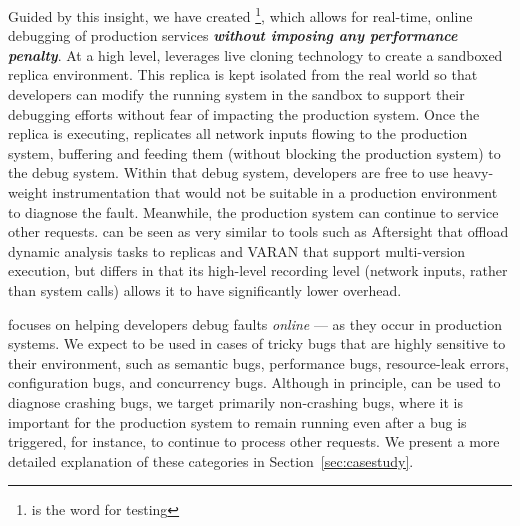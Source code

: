 Guided by this insight, we have created \parikshan\footnote{\parikshan is the \toolNameLang word for  testing}, which allows for real-time, online debugging of production services \textbf{\emph{without imposing any performance penalty}}.
At a high level, \parikshan leverages live cloning technology to create a sandboxed replica environment.
This replica is kept isolated from the real world so that developers can modify the running system in the sandbox to support their debugging efforts without fear of impacting the production system.
Once the replica is executing, \parikshan replicates all network inputs flowing to the production system, buffering and feeding them (without blocking the production system) to the debug system.
Within that debug system, developers are free to use heavy-weight instrumentation that would not be suitable in a production environment to diagnose the fault.
Meanwhile, the production system can continue to service other requests.
\parikshan can be seen as very similar to tools such as Aftersight \cite{aftersight} that offload dynamic analysis tasks to replicas and VARAN \cite{Hosek:2015:VUE:2694344.2694390} that support multi-version execution, but differs in that its high-level recording level (network inputs, rather than system calls) allows it to have significantly lower overhead.


\parikshan focuses on helping developers debug faults \emph{online} --- as they occur in production systems.
We expect \parikshan to be used in cases of tricky bugs that are highly sensitive to their environment, such as semantic bugs, performance bugs, resource-leak errors, configuration bugs, and concurrency bugs.
Although in principle, \parikshan can be used to diagnose crashing bugs, we target primarily non-crashing bugs, where it is important for the production system to remain running even after a bug is triggered, for instance, to continue to process other requests. 
We present a more detailed explanation of these categories in Section~\ref{sec:casestudy}.

